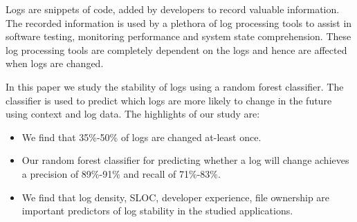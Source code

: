 Logs are snippets of code, added by developers to record valuable information. The recorded information is used by a plethora of log processing tools to assist in software testing, monitoring performance and system state comprehension. These log processing tools are completely dependent on the logs and hence are affected when logs are changed.

 In this paper we study the stability of logs using a random forest classifier. The classifier is used to predict which logs are more likely to change in the future using context and log data.  The highlights of our study are:

\begin{itemize}
	\item We find that 35\%-50\% of logs are changed at-least once.
	\item Our random forest classifier for predicting whether a log will change achieves a precision of 89\%-91\% and recall of 71\%-83\%. 
	\item We find that log density, SLOC, developer experience, file ownership are important predictors of log stability in the studied applications.  	
	
\end{itemize}




